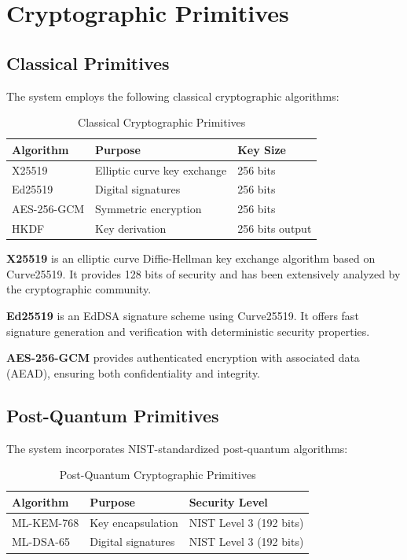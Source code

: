 \documentclass[12pt,a4paper]{article}
\begin{document}
\section{Cryptographic Primitives}

\subsection{Classical Primitives}

The system employs the following classical cryptographic algorithms:

\begin{table}[h]
\centering
\caption{Classical Cryptographic Primitives}
\begin{tabular}{@{}lll@{}}
\toprule
Algorithm & Purpose & Key Size \\ \midrule
X25519 & Elliptic curve key exchange & 256 bits \\
Ed25519 & Digital signatures & 256 bits \\
AES-256-GCM & Symmetric encryption & 256 bits \\
HKDF & Key derivation & 256 bits output \\ \bottomrule
\end{tabular}
\end{table}

\textbf{X25519} is an elliptic curve Diffie-Hellman key exchange algorithm based on Curve25519. It provides 128 bits of security and has been extensively analyzed by the cryptographic community.

\textbf{Ed25519} is an EdDSA signature scheme using Curve25519. It offers fast signature generation and verification with deterministic security properties.

\textbf{AES-256-GCM} provides authenticated encryption with associated data (AEAD), ensuring both confidentiality and integrity.

\subsection{Post-Quantum Primitives}

The system incorporates NIST-standardized post-quantum algorithms:

\begin{table}[h]
\centering
\caption{Post-Quantum Cryptographic Primitives}
\begin{tabular}{@{}lll@{}}
\toprule
Algorithm & Purpose & Security Level \\ \midrule
ML-KEM-768 & Key encapsulation & NIST Level 3 (192 bits) \\
ML-DSA-65 & Digital signatures & NIST Level 3 (192 bits) \\ \bottomrule
\end{tabular}
\end{table}
\end{document}
